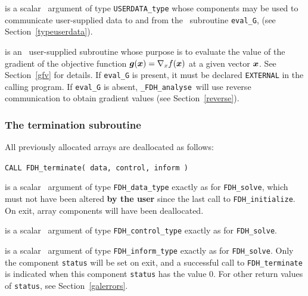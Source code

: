 \documentclass{galahad}
\newcommand{\packagename}{FDH}
\newcommand{\fullpackagename}{\libraryname\_\packagename}
\newcommand{\solver}{{\tt \fullpackagename\_analyse}}
\begin{document}
\begin{description}
 is a scalar \intentinout\ argument of type 
{\tt USERDATA\_type} whose components may be used
to communicate user-supplied data to and from the
\optional\ subroutine {\tt eval\_G},
(see Section~\ref{typeuserdata}). 

 is an \optional\ 
user-supplied subroutine whose purpose is to evaluate the value of the 
gradient of the objective function ${\bm{g}}({\bm{x}}) = \nabla_x f({\bm{x}})$ 
at a given vector ${\bm{x}}$.
See Section~\ref{gfv} for details.
If {\tt eval\_G} is present, 
it must be declared {\tt EXTERNAL} in the calling program.
If {\tt eval\_G} is absent, \solver\ will use reverse communication to
obtain gradient values (see Section~\ref{reverse}).

\end{description}


\subsubsection{The  termination subroutine}
All previously allocated arrays are deallocated as follows:
\vspace*{1mm}

\hspace{8mm}
{\tt CALL \packagename\_terminate( data, control, inform )}

\vspace*{-1mm}
\begin{description}

 is a scalar \intentinout\ argument of type 
{\tt \packagename\_data\_type} 
exactly as for
{\tt \packagename\_solve},
which must not have been altered {\bf by the user} since the last call to 
{\tt \packagename\_initialize}.
On exit, array components will have been deallocated.

 is a scalar \intentin\ argument of type 
{\tt \packagename\_control\_type}
exactly as for
{\tt \packagename\_solve}.

 is a scalar \intentout\ argument of type
{\tt \packagename\_inform\_type}
exactly as for
{\tt \packagename\_solve}.
Only the component {\tt status} will be set on exit, and a 
successful call to 
{\tt \packagename\_terminate}
is indicated when this  component {\tt status} has the value 0. 
For other return values of {\tt status}, see Section~\ref{galerrors}.

\end{description}
\end{document}
